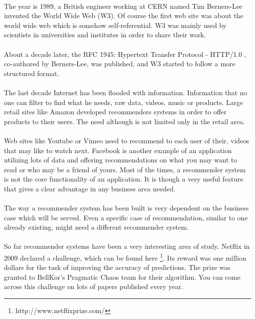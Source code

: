\paragraph{} The year is 1989, a British engineer working at CERN named Tim Berners-Lee invented the World Wide Web (W3). Of course the first web site was about the world wide web which is somehow self-referential. W3 was mainly used by scientists in universities and institutes in order to share their work. 

\paragraph{}About a decade later, the RFC 1945: Hypertext Transfer Protocol - HTTP/1.0 \cite{berners1997rfc}, co-authored by Berners-Lee, was published, and W3 started to follow a more structured format.

\paragraph{} The last decade Internet has been flooded with information. Information that no one can filter to find what he needs, raw data, videos, music or products. Large retail sites like Amazon developed recommenders systems in order to offer products to their users. The need although is not limited only in the retail area. 
\paragraph{}Web sites like Youtube or Vimeo need to recommend to each user of their, videos that may like to watch next. Facebook is another example of an application utilizing lots of data and offering recommendations on what you may want to read or who may be a friend of yours. Most of the times, a recommender system is not the core functionality of an application. It is though a very useful feature that gives a clear advantage in any business area needed.

\paragraph{}The way a recommender system has been built is very dependent on the business case which will be served. Even a specific case of recommendation, similar to one already existing, might need a different recommender system.

\paragraph{} So far recommender systems have been a very interesting area of study. Netflix in 2009 declared a challenge, which can be found here \footnote{http://www.netflixprize.com/}. Its  reward was one million dollars for the task of improving the accuracy of predictions. The prize was granted to BellKor’s Pragmatic Chaos team for their algorithm. You can come across this challenge on lots of papers published every year.


